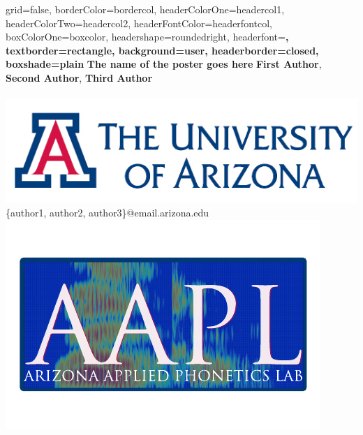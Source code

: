 \documentclass[a0paper,landscape,columns=3]{baposter}
\begin{document}
\begin{poster}{
grid=false,
borderColor=bordercol, %
headerColorOne=headercol1, %
headerColorTwo=headercol2, %
headerFontColor=headerfontcol, %
boxColorOne=boxcolor, %
headershape=roundedright, %
headerfont=\Large\sf\bf, %
textborder=rectangle,
background=user,
headerborder=closed, %
boxshade=plain
}
{}
%
%
{\sf\bf \LARGE{The name of the poster goes here}}
{\vspace{.6em} \textbf{First Author}, \textbf{Second Author}, \textbf{Third Author}\\ 
 \\
{\hspace{-7in}\includegraphics[scale=0.2]{UA_logo}\phantom{.}} \\
{\vspace{-.4in}\smaller \{author1, author2, author3\}@email.arizona.edu} \\
{\vspace{-.45in}\phantom{.}\hspace{7in}\includegraphics[scale=0.35]{aalp_logo}}\vspace{-.6in}}





\end{poster}
\end{document}
